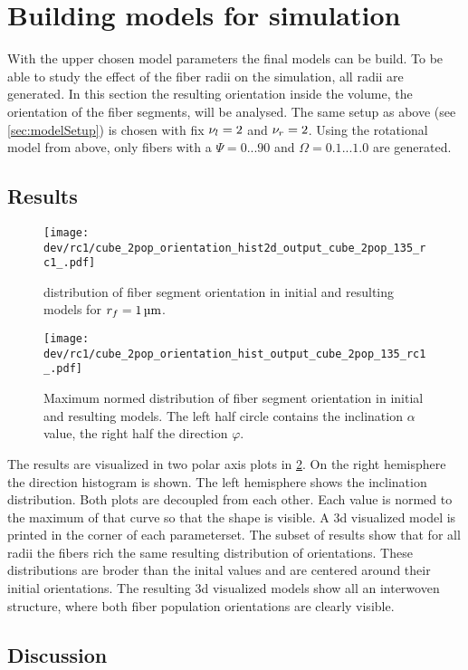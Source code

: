 \section{Building models for simulation}
% 
With the upper chosen model parameters the final models can be build.
To be able to study the effect of the fiber radii on the simulation, all radii are generated.
In this section the resulting orientation inside the volume, \ie{} the orientation of the fiber segments, will be analysed.
The same setup as above (see \cref{sec:modelSetup}) is chosen with fix $\textnormal{$\nu_{l}$}=\SI{2}{}$ and $\textnormal{$\nu_{r}$} = \SI{2}{}$.
Using the rotational model from above, only fibers with a $\Psi =  0...90$ and $\Omega = 0.1...1.0$ are generated.
% 
% 
% 
\subsection{Results}
% 
\begin{figure}[!t]
\centering
\texttt{[image: dev/rc1/cube\_2pop\_orientation\_hist2d\_output\_cube\_2pop\_135\_rc1\_.pdf]}
\caption[Model orientation histograms]{distribution of fiber segment orientation in initial and resulting models for $\fiberRadius = \SI{1}{\micro\meter}$.  }
\label{fig:modelOrientation}
\end{figure}
% 
\begin{figure}[p]
\centering
\texttt{[image: dev/rc1/cube\_2pop\_orientation\_hist\_output\_cube\_2pop\_135\_rc1\_.pdf]}
\caption[Model orientation histograms]{Maximum normed distribution of fiber segment orientation in initial and resulting models. The left half circle contains the inclination $\alpha$ value, the right half the direction $\varphi$. }
\label{fig:modelOrientationHist1d}
\end{figure}
% 
The results are visualized in two polar axis plots in \cref{fig:modelOrientationHist1d}. On the right hemisphere the direction histogram is shown.
The left hemisphere shows the inclination distribution.
Both plots are decoupled from each other. 
Each value is normed to the maximum of that curve so that the shape is visible.
A 3d visualized model is printed in the corner of each parameterset.
% 
The subset of results show that for all radii the fibers rich the same resulting distribution of orientations. 
These distributions are broder than the inital values and are centered around their initial orientations.
The resulting 3d visualized models show all an interwoven structure, where both fiber population orientations are clearly visible. 
%  
\subsection{Discussion}
%
% 
